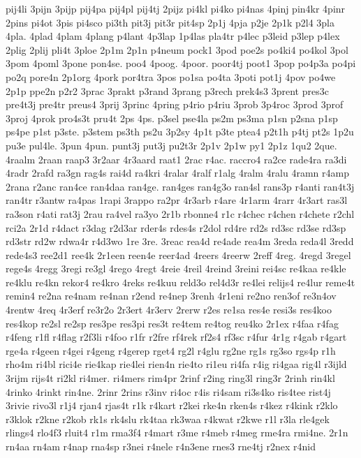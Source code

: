 {pij4li
3pijn
3pijp
pij4pa
pij4pl
pij4tj
2pijz
pi4kl
pi4ko
pi4nas
4pinj
pin4kr
4pinr
2pins
pi4ot
3pis
pi4sco
pi3th
pit3j
pit3r
pit4sp
2p1j
4pja
p2je
2p1k
p2l4
3pla
4pla.
4plad
4plam
4plang
p4lant
4p3lap
1p4las
pla4tr
p4lec
p3leid
p3lep
p4lex
2plig
2plij
pli4t
3ploe
2p1m
2p1n
p4neum
pock1
3pod
poe2s
po4ki4
po4kol
3pol
3pom
4poml
3pone
pon4se.
poo4
4poog.
4poor.
poor4tj
poot1
3pop
po4p3a
po4pi
po2q
pore4n
2p1org
4pork
por4tra
3pos
po1sa
po4ta
3poti
pot1j
4pov
po4we
2p1p
ppe2n
p2r2
3prac
3prakt
p3rand
3prang
p3rech
prek4s3
3prent
pres3c
pre4t3j
pre4tr
preus4
3prij
3princ
4pring
p4rio
p4riu
3prob
3p4roc
3prod
3prof
3proj
4prok
pro4s3t
pru4t
2ps
4ps.
p3sel
pse4la
ps2m
ps3ma
p1sn
p2sna
p1sp
ps4pe
p1st
p3ste.
p3stem
ps3th
ps2u
3p2sy
4p1t
p3te
ptea4
p2t1h
p4tj
pt2s
1p2u
pu3e
pul4le.
3pun
4pun.
punt3j
put3j
pu2t3r
2p1v
2p1w
py1
2p1z
1qu2
2que.
4raalm
2raan
raap3
3r2aar
4r3aard
raat1
2rac
r4ac.
raccro4
ra2ce
rade4ra
ra3di
4radr
2rafd
ra3gn
rag4s
rai4d
ra4kri
4ralar
4ralf
r1alg
4ralm
4ralu
4ramn
r4amp
2rana
r2anc
ran4ce
ran4daa
ran4ge.
ran4ges
ran4g3o
ran4sl
rans3p
r4anti
ran4t3j
ran4tr
r3antw
ra4pas
1rapi
3rappo
ra2pr
4r3arb
r4are
4r1arm
4rarr
4r3art
ras3l
ra3son
r4ati
rat3j
2rau
ra4vel
ra3yo
2r1b
rbonne4
r1c
r4chec
r4chen
r4chete
r2chl
rci2a
2r1d
r4dact
r3dag
r2d3ar
rder4s
rdes4s
r2dol
rd4re
rd2s
rd3sc
rd3se
rd3sp
rd3str
rd2w
rdwa4r
r4d3wo
1re
3re.
3reac
rea4d
re4ade
rea4m
3reda
reda4l
3redd
rede4s3
ree2d1
ree4k
2r1een
reen4e
reer4ad
4reers
4reerw
2reff
4reg.
4regd
3regel
rege4s
4regg
3regi
re3gl
4rego
4regt
4reie
4reil
4reind
3reini
rei4sc
re4kaa
re4kle
re4klu
re4kn
rekor4
re4kro
4reks
re4kuu
reld3o
rel4d3r
re4lei
relijs4
re4lur
reme4t
remin4
re2na
re4nam
re4nan
r2end
re4nep
3renh
4r1eni
re2no
ren3of
re3n4ov
4rentw
4req
4r3erf
re3r2o
2r3ert
4r3erv
2rerw
r2es
re1sa
res4e
resi3s
res4koo
res4kop
re2sl
re2sp
res3pe
res3pi
res3t
re4tem
re4tog
reu4ko
2r1ex
r4faa
r4fag
r4feng
r1fl
r4flag
r2f3li
r4foo
r1fr
r2fre
rf4rek
rf2s4
rf3sc
r4fur
4r1g
r4gab
r4gart
rge4a
r4geen
r4gei
r4geng
r4gerep
rget4
rg2l
r4glu
rg2ne
rg1s
rg3so
rgs4p
r1h
rho4m
ri4bl
rici4e
rie4kap
rie4lei
rien4n
rie4to
ri1eu
ri4fa
r4ig
ri4gaa
rig4l
r3ijld
3rijm
rijs4t
ri2kl
ri4mer.
ri4mers
rim4pr
2rinf
r2ing
ring3l
ring3r
2rinh
rin4kl
4rinko
4rinkt
rin4ne.
2rinr
2rins
r3inv
ri4oc
r4is
ri4sam
ri3s4ko
ris4tee
rist4j
3rivie
rivo3l
r1j4
rjan4
rjas4t
r1k
r4kart
r2kei
rke4n
rken4s
r4kez
r4kink
r2klo
r3klok
r2kne
r2kob
rk1s
rk4slu
rk4taa
rk3waa
r4kwat
r2kwe
r1l
r3la
rle4gek
rlings4
rlo4f3
rluit4
r1m
rma3f4
r4mart
r3me
r4meb
r4meg
rme4ra
rmi4ne.
2r1n
rn4aa
rn4am
r4nap
rna4sp
r3nei
r4nele
r4n3ene
rnes3
rne4tj
r2nex
r4nid
}

